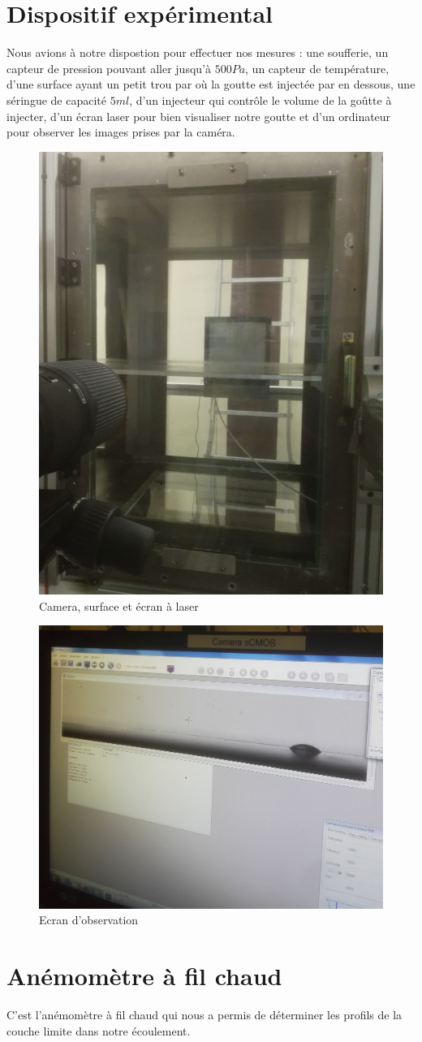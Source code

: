 \documentclass[french]{article}
\begin{document}
\section{Dispositif expérimental}


Nous avions à notre dispostion pour effectuer nos mesures : une soufferie, un capteur de pression pouvant aller jusqu'à $500Pa$, un capteur de température, d'une surface ayant un petit trou par où la goutte est injectée par en dessous, une séringue de capacité $5ml$, d'un injecteur qui contrôle le volume de la goûtte à injecter, d'un écran laser pour bien visualiser notre goutte et d'un ordinateur pour observer les images prises par la caméra.

\begin{figure}[hb]
\centering
	\includegraphics[width = 0.4\linewidth]{./image/Surface.jpg}
	\caption{Camera, surface et écran à laser}
	\label{fig:Plan}
\end{figure}
\begin{figure}[hb]
\centering
	\includegraphics[width = 0.5\linewidth]{./image/Ecran.jpg}
	\caption{Ecran d'observation}
	\label{fig:Ecran d'observation}
\end{figure}

\newpage

\section{Anémomètre à fil chaud}
C'est l'anémomètre à fil chaud qui nous a permis de déterminer les profils de la couche limite dans notre écoulement.
\end{document}
